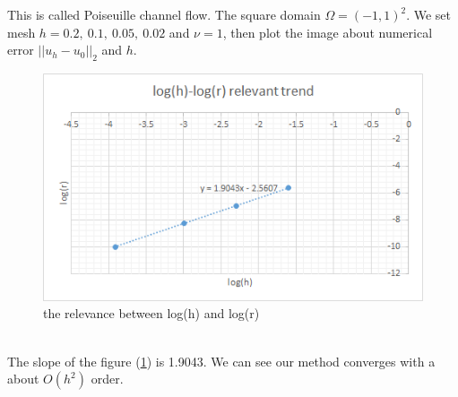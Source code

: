 \documentclass[a4paper]{article}
\begin{document}
This is called Poiseuille channel flow. The square domain $\Omega = (-1,1)^2$. We set mesh $h=0.2,\ 0.1,\ 0.05,\ 0.02$ and $\nu=1$, then plot the image about numerical error $||u_h-u_0||_2$ and $h$.
\begin{figure}[h]
\centering
\includegraphics[scale = 0.8]{convergence.png}
\caption{the relevance between log(h) and log(r)}
\label{im::log(h)-res}
\end{figure}
\\
The slope of the figure (\ref{im::log(h)-res}) is 1.9043. We can see our method converges with a about $O(h^2)$ order. \\
\\
\end{document}
